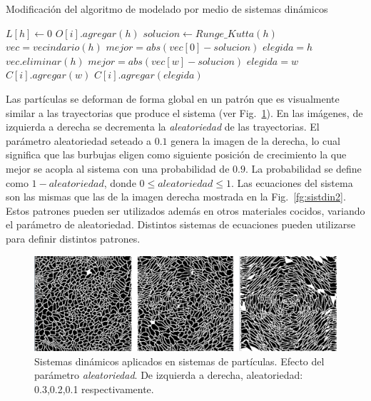 \begin{algorithm}[h!]
\caption{Modificación del algoritmo de modelado por medio de sistemas dinámicos}
\begin{algorithmic}
\State $L[h]\gets 0$ 
\State $O[i].agregar(h)$
\State $solucion \gets Runge\_Kutta(h)$
\State $vec = vecindario(h)$
\State $mejor = abs(vec[0] - solucion)$
\State $elegida = h$
\State $vec.eliminar(h)$
        \State $mejor = abs(vec[w]-solucion)$
        \State $elegida = w$
    \EndIf
        \State $C[i].agregar(w)$
    \EndIf
\EndFor
{}
\State $C[i].agregar(elegida)$
\end{algorithmic}
\end{algorithm}

Las part\'iculas se deforman de forma global en un patr\'on que es visualmente similar a las trayectorias que produce el sistema (ver Fig.~\ref{fg:sistdin3}). En las im\'agenes, de izquierda a derecha se decrementa la {\em aleatoriedad} de las trayectorias. El par\'ametro aleatoriedad seteado a $0.1$ genera la imagen de la derecha, lo cual significa que las burbujas eligen como siguiente posición de crecimiento la que mejor se acopla al sistema con una probabilidad de $0.9$. La probabilidad se define como $1-aleatoriedad$, donde $0 \leq aleatoriedad \leq 1$. Las ecuaciones del sistema son las mismas que las de la imagen derecha mostrada en la Fig.~\ref{fg:sistdin2}. Estos patrones pueden ser utilizados adem\'as en otros materiales cocidos, variando el par\'ametro de aleatoriedad. Distintos sistemas de ecuaciones pueden utilizarse para definir distintos patrones.

\begin{figure}[htb!]
  \centerline{\includegraphics[width=13cm]{sistdin3}}
  \caption[Sistemas din\'amicos aplicados en sistemas de part\'iculas]{Sistemas din\'amicos aplicados en sistemas de part\'iculas. Efecto del parámetro {\em aleatoriedad}. De izquierda a derecha, aleatoriedad: 0.3,0.2,0.1 respectivamente. }
  \label{fg:sistdin3}
\end{figure}

